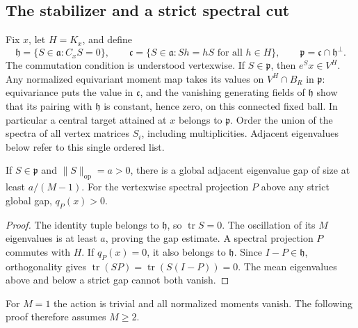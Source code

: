 \subsection{The stabilizer and a strict spectral cut}
Fix $x$, let $H=K_x$, and define
\[
 \mathfrak h=\{S\in\mathfrak a:C_xS=0\},\qquad
 \mathfrak c=\{S\in\mathfrak a:Sh=hS\text{ for all }h\in H\},
 \qquad \mathfrak p=\mathfrak c\cap\mathfrak h^\perp.
\]
The commutation condition is understood vertexwise.
If $S\in\mathfrak p$, then $e^Sx\in V^H$. Any normalized equivariant
moment map takes its values on $V^H\cap B_R$ in $\mathfrak p$:
equivariance puts the value in $\mathfrak c$, and the vanishing
generating fields of $\mathfrak h$ show that its pairing with
$\mathfrak h$ is constant, hence zero, on this connected fixed ball.
In particular a central target attained at $x$ belongs to $\mathfrak p$.
Order the union of the spectra of all vertex matrices $S_i$,
including multiplicities. Adjacent eigenvalues below refer to this
single ordered list.

\begin{lemma}\label{lem:strict-cut}
If $S\in\mathfrak p$ and $\|S\|_{\mathrm{op}}=a>0$, there is a
global adjacent eigenvalue gap of size at least $a/(M-1)$.
For the vertexwise spectral projection $P$ above any strict global gap,
$q_P(x)>0$.
\end{lemma}
\begin{proof}
The identity tuple belongs to $\mathfrak h$, so $\operatorname{tr}S=0$.
The oscillation of its $M$ eigenvalues is at least $a$, proving the
gap estimate. A spectral projection $P$ commutes with $H$. If
$q_P(x)=0$, it also belongs to $\mathfrak h$. Since $I-P\in\mathfrak h$,
orthogonality gives
$\operatorname{tr}(SP)=\operatorname{tr}(S(I-P))=0$.
The mean eigenvalues above and below a strict gap cannot both vanish.
\end{proof}
For $M=1$ the action is trivial and all normalized moments vanish.
The following proof therefore assumes $M\ge2$.

